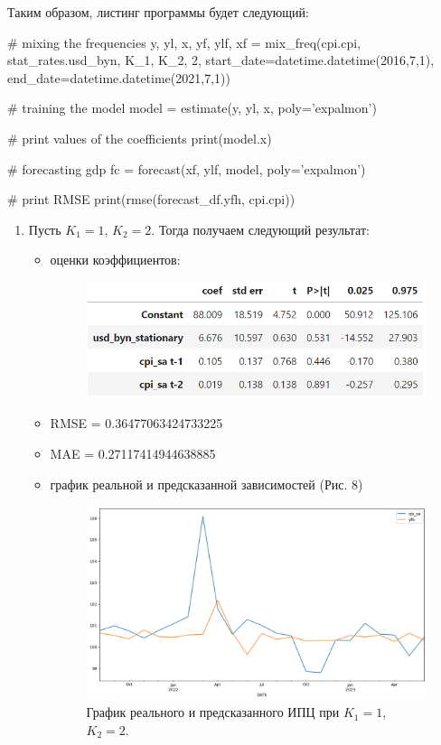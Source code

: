 \documentclass[a4paper, 14pt]{extarticle}
\begin{document}
	Таким образом, листинг программы будет следующий:
	\begin{python}
		# mixing the frequencies
		y, yl, x, yf, ylf, xf = mix_freq(cpi.cpi, stat_rates.usd_byn, K_1, K_2, 2,
		start_date=datetime.datetime(2016,7,1),
		end_date=datetime.datetime(2021,7,1))
		
		# training the model
		model = estimate(y, yl, x, poly='expalmon')
		
		# print values of the coefficients
		print(model.x)
		
		# forecasting gdp
		fc = forecast(xf, ylf, model, poly='expalmon')
		
		# print RMSE 
		print(rmse(forecast_df.yfh, cpi.cpi))\end{python}
		\begin{enumerate}
			\item Пусть $K_1 = 1$, $K_2 = 2$. Тогда получаем следующий результат:
			\begin{itemize}
				\item оценки коэффициентов:
				\begin{figure}[h!]
					\centering
					\includegraphics[scale=1.1]{images/tab_3}
					\label{fig:tab3}
				\end{figure}
				
				\item RMSE = 0.36477063424733225
				\item MAE = 0.27117414944638885
				\item график реальной и предсказанной зависимостей (Рис. 8)
				\begin{figure}[h!]
					\centering
					\includegraphics[scale=0.4]{images/pic_08}
					\caption[Рис. 8]{График реального и предсказанного ИПЦ при $K_1 = 1$, $K_2 = 2$.}
					\label{fig:pic08}
				\end{figure}
				

\end{itemize}
\end{enumerate}
\end{document}

